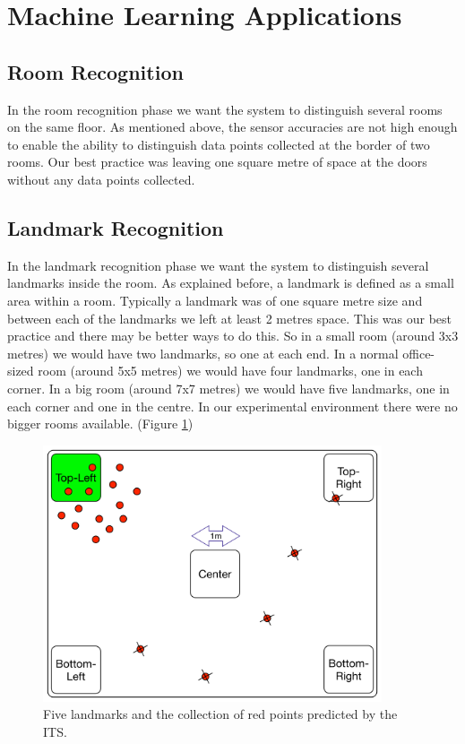 \section{Machine Learning Applications}

\subsection{Room Recognition}
In the room recognition phase we want the system to distinguish several rooms on the same floor. As mentioned above, the sensor accuracies are not high enough to enable the ability to distinguish data points collected at the border of two rooms. Our best practice was leaving one square metre of space at the doors without any data points collected.


\subsection{Landmark Recognition}
In the landmark recognition phase we want the system to distinguish several landmarks inside the room. As explained before, a landmark is defined as a small area within a room. Typically a landmark was of one square metre size and between each of the landmarks we left at least 2 metres space. This was our best practice and there may be better ways to do this. So in a small room (around 3x3 metres) we would have two landmarks, so one at each end. In a normal office-sized room (around 5x5 metres) we would have four landmarks, one in each corner. In a big room (around 7x7 metres) we would have five landmarks, one in each corner and one in the centre. In our experimental environment there were no bigger rooms available. (Figure \ref{fig:LandmarksChapter3})

\begin{figure}[H]
\centering
\includegraphics[width=100mm]{Figures/Landmarks.jpg}
\decoRule
\caption[Landmarks]{Five landmarks and the collection of red points predicted by the ITS.}
\label{fig:LandmarksChapter3}
\end{figure}



